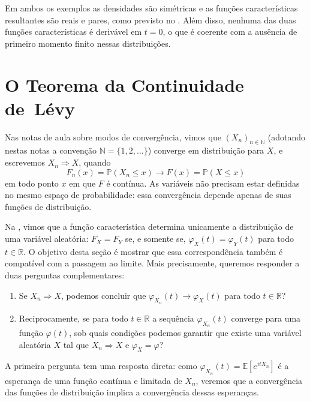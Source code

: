 \documentclass[12pt,portuguese]{article}
\theoremstyle{definition}
\theoremstyle{plainexercise}
\theoremstyle{starredexercise}
\theoremstyle{definition}
\begin{document}
\bigskip

Em ambos os exemplos as densidades são simétricas e as funções características
resultantes são reais e pares, como previsto no . Além disso,
nenhuma das duas funções características é derivável em $t=0$, o que é coerente com a ausência
de primeiro momento finito nessas distribuições.

\section{O Teorema da Continuidade de~Lévy}\label{sec:continuidade}

Nas notas de aula sobre modos de convergência, vimos que $(X_n)_{n\in\mathbb{N}}$
(adotando nestas notas a convenção $\mathbb{N}=\{1,2,\ldots\}$) converge em
distribuição para $X$, e escrevemos $X_n\Rightarrow X$, quando
\[
F_n(x)=\mathbb{P}(X_n\leqslant x)
\longrightarrow
F(x)=\mathbb{P}(X\leqslant x)
\]
em todo ponto $x$ em que $F$ é contínua. As variáveis não precisam estar
definidas no mesmo espaço de probabilidade: essa convergência depende apenas
de suas funções de distribuição.


\bigskip

Na , vimos que a função característica determina unicamente a
distribuição de uma variável aleatória: $F_X=F_Y$ se, e somente se,
$\varphi_X(t)=\varphi_Y(t)$ para todo $t\in\mathbb{R}$. O objetivo desta seção é
mostrar que essa correspondência também é compatível com a passagem ao limite.
Mais precisamente, queremos responder a duas perguntas complementares:
\begin{enumerate}[label=\textup{(\roman*)}]
\item Se $X_n\Rightarrow X$, podemos concluir que
$\varphi_{X_n}(t)\to\varphi_X(t)$ para todo $t\in\mathbb{R}$?
\item Reciprocamente, se para todo $t\in\mathbb{R}$ a sequência
$\varphi_{X_n}(t)$ converge para uma função $\varphi(t)$, sob quais condições
podemos garantir que existe uma variável aleatória $X$ tal que $X_n\Rightarrow X$
e $\varphi_X=\varphi$?
\end{enumerate}

\bigskip

A primeira pergunta tem uma resposta direta: como
$\varphi_{X_n}(t)=\mathbb{E}[e^{itX_n}]$ é a esperança de uma função contínua e
limitada de $X_n$, veremos que a convergência das funções de distribuição
implica a convergência dessas esperanças.

\bigskip
\end{document}

